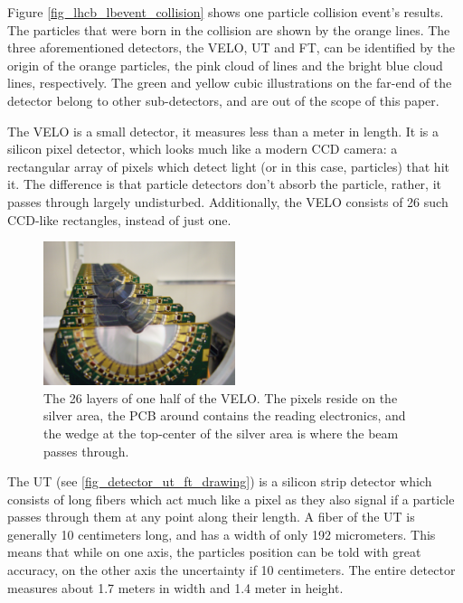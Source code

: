 \documentclass[12pt]{article}
\begin{document}
Figure \ref{fig_lhcb_lbevent_collision} shows one particle collision event's results. The particles that were born in the collision are shown by the orange lines. The three aforementioned detectors, the VELO, UT and FT, can be identified by the origin of the orange particles, the pink cloud of lines and the bright blue cloud lines, respectively. The green and yellow cubic illustrations on the far-end of the detector belong to other sub-detectors, and are out of the scope of this paper.

The VELO is a small detector, it measures less than a meter in length. It is a silicon pixel detector, which looks much like a modern CCD camera: a rectangular array of pixels which detect light (or in this case, particles) that hit it. The difference is that particle detectors don't absorb the particle, rather, it passes through largely undisturbed. Additionally, the VELO consists of 26 such CCD-like rectangles, instead of just one.

\begin{figure}[H]
	\begin{center}
		\includegraphics[width=0.5\textwidth]{detector_velo_real}
	\end{center}
	\caption{The 26 layers of one half of the VELO. The pixels reside on the silver area, the PCB around contains the reading electronics, and the wedge at the top-center of the silver area is where the beam passes through. \cite{cern_document_server}}
	\label{fig_detector_velo_real}
\end{figure}

The UT (see \ref{fig_detector_ut_ft_drawing}) is a silicon strip detector which consists of long fibers which act much like a pixel as they also signal if a particle passes through them at any point along their length. A fiber of the UT is generally 10 centimeters long, and has a width of only 192 micrometers. This means that while on one axis, the particles position can be told with great accuracy, on the other axis the uncertainty if 10 centimeters. The entire detector measures about 1.7 meters in width and 1.4 meter in height.
\end{document}
